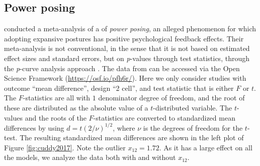 \documentclass{article}
\theoremstyle{plain}
\theoremstyle{definition}
\renewcommand{\sqrt}[1]{(#1)^{1/2}}
\begin{document}
\subsection{Power posing\label{subsec:cuddy2018}}

\citet{cuddy2018p} conducted a meta-analysis of a of \emph{power posing}, an alleged phenomenon for which adopting expansive postures has positive psychological feedback effects. Their meta-analysis is not conventional, in the sense that it is not based on estimated effect sizes and standard errors, but on \emph{p}-values through test statistics, through the \emph{p}-curve analysis approach \citep{simonsohn2014p}. The data from \citet{cuddy2018p} can be accessed via the Open Science Framework (\url{https://osf.io/pfh6r/}). Here we only consider studies with outcome ``mean difference'', design ``2 cell'', and test statistic that is either $F$ or $t$. The $F$-statistics are all with $1$ denominator degree of freedom, and the root of these are distributed as the absolute value of a $t$-distributed variable. The $t$-values and the roots of the $F$-statistics are converted to standardized mean differences by using $d = t\sqrt{2/\nu}$, where $\nu$ is the degrees of freedom for the $t$-test. The resulting standardized mean differences are shown in the left plot of Figure \ref{fig:cuddy2017}. Note the outlier $x_{12} = 1.72$. As it has a large effect on all the models, we analyze the data both with and without $x_{12}$.
\end{document}
